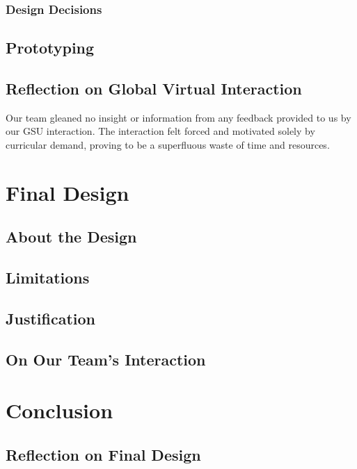 \documentclass[11pt]{article}
\begin{document}
\begin{multicols*}{2}
            \subsubsection{Design Decisions}

        \subsection{Prototyping}

        \subsection{Reflection on Global Virtual Interaction}
            Our team gleaned no insight or information from any feedback provided to us by our GSU interaction. The interaction felt forced and motivated solely by curricular demand, proving to be a superfluous waste of time and resources.
            
    \section{Final Design}

        \subsection{About the Design}

        \subsection{Limitations}

        \subsection{Justification}

        \subsection{On Our Team's Interaction}

    \section{Conclusion}
        \subsection{Reflection on Final Design}


\end{multicols*}
\end{document}
